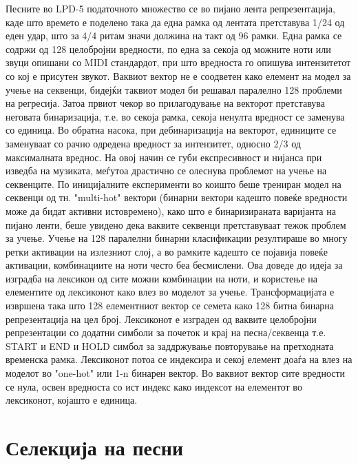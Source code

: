 Песните во LPD-5 податочното множество се во пијано лента репрезентација, каде што времето е поделено така да една рамка од лентата претставува 1/24 од еден удар, што за 4/4 ритам значи должина на такт од 96 рамки. Една рамка се содржи од 128 целобројни вредности, по една за секоја од можните ноти или звуци опишани со MIDI стандардот, при што вредноста го опишува интензитетот со кој е присутен звукот. Ваквиот вектор не е соодветен како елемент на модел за учење на секвенци, бидејќи таквиот модел би решавал паралелно 128 проблеми на регресија. Затоа првиот чекор во прилагодување на векторот претставува неговата бинаризација, т.е. во секоја рамка, секоја ненулта вредност се заменува со единица. Во обратна насока, при дебинаризација на векторот, единиците се заменуваат со рачно одредена вредност за интензитет, односно 2/3 од максималната вреднос. На овој начин се губи експресивност и нијанса при изведба на музиката, меѓутоа драстично се олеснува проблемот на учење на секвенците. 
По иницијалните експерименти во коишто беше трениран модел на секвенци од тн. "multi-hot" вектори (бинарни вектори кадешто повеќе вредности може да бидат активни истовремено), како што е бинаризираната варијанта на пијано ленти, беше увидено дека ваквите секвенци претставуваат тежок проблем за учење. Учење на 128 паралелни бинарни класификации резултираше во многу ретки активации на излезниот слој, а во рамките кадешто се појавија повеќе активации, комбинациите на ноти често беа бесмислени. Ова доведе до идеја за изградба на лексикон од сите можни комбинации на ноти, и користење на елементите од лексиконот како влез во моделот за учење. Трансформацијата е извршена така што 128 елементниот вектор се семета како 128 битна бинарна репрезентација на цел број. Лексиконот е изграден од ваквите целобројни репрезентации со додатни симболи за почеток и крај на песна/секвенца т.е. START и END и HOLD симбол за заддржување повторување на претходната временска рамка. Лексиконот потоа се индексира и секој елемент доаѓа на влез на моделот во "one-hot" или 1-n бинарен вектор. Во ваквиот вектор сите вредности се нула, освен вредноста со ист индекс како индексот на елементот во лексиконот, којашто е единица.

\section{Селекција на песни}

